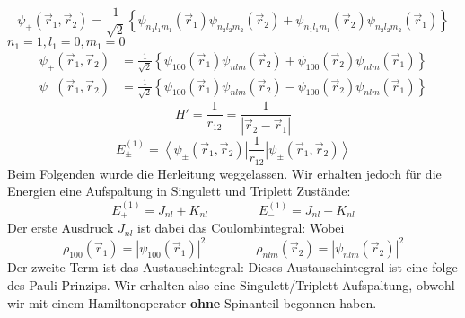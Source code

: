 \begin{equation*}
\psi_{+} (\vec{r}_1, \vec{r}_2) = \frac{1}{\sqrt{2}} \left\{ \psi_{n_1 l_1 m_1} (\vec{r}_1) \psi_{n_2l_2m_2} (\vec{r}_2) + \psi_{n_1 l_1 m_1} (\vec{r}_2) \psi_{n_2l_2m_2} (\vec{r}_1) \right\}
\end{equation*}
$ n_1 = 1, l_1 = 0, m_1 = 0 $
\begin{align*}
\psi_{+} (\vec{r}_1, \vec{r}_2) &= \frac{1}{\sqrt{2}} \left\{ \psi_{100} (\vec{r}_1) \psi_{nlm} (\vec{r}_2) + \psi_{100} (\vec{r}_2) \psi_{nlm} (\vec{r}_1) \right\}\\
\psi_{-} (\vec{r}_1, \vec{r}_2) &= \frac{1}{\sqrt{2}} \left\{ \psi_{100} (\vec{r}_1) \psi_{nlm} (\vec{r}_2) - \psi_{100} (\vec{r}_2) \psi_{nlm} (\vec{r}_1) \right\}
\end{align*}
\begin{equation*}
H' = \frac{1}{r_{12}} = \frac{1}{|\vec{r}_2 - \vec{r}_1|}
\end{equation*}
\begin{equation*}
E_{\pm}^{(1)} = \left\langle \psi_{\pm}(\vec{r}_1, \vec{r}_2) \right| \frac{1}{r_{12}} \left| \psi_{\pm}(\vec{r}_1, \vec{r}_2) \right\rangle
\end{equation*}
Beim Folgenden wurde die Herleitung weggelassen. Wir erhalten jedoch für die Energien eine Aufspaltung in Singulett und Triplett Zustände:
\begin{equation*}
E_{+}^{(1)} = J_{nl} + K_{nl} \qquad \qquad E_{-}^{(1)} = J_{nl} - K_{nl}
\end{equation*}
Der erste Ausdruck $ J_{nl} $ ist dabei das Coulombintegral:
Wobei
\begin{equation*}
\rho_{100}(\vec{r}_1) = |\psi_{100}(\vec{r}_1)|^2 \qquad \qquad \rho_{nlm}(\vec{r}_2) = |\psi_{nlm}(\vec{r}_2)|^2
\end{equation*}
Der zweite Term ist das Austauschintegral:
Dieses Austauschintegral ist eine folge des Pauli-Prinzips. Wir erhalten also eine Singulett/Triplett Aufspaltung, obwohl wir mit einem Hamiltonoperator \textbf{ohne} Spinanteil begonnen haben.\par
